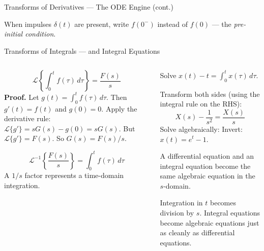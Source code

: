\documentclass[aspectratio=169,11pt]{beamer}
\newcommand{\resizeeq}[1]{\resizebox{\textwidth}{!}{$#1$}}
\begin{document}
\begin{frame}{Transforms of Derivatives --- The ODE Engine (cont.)}
\footnotesize
\begin{warningbox}
When impulses $\delta(t)$ are present, write $f(0^{-})$ instead of $f(0)$ --- the \emph{pre-initial condition}.
\end{warningbox}
\end{frame}

\begin{frame}{Transforms of Integrals --- and Integral Equations}
\footnotesize
\begin{columns}[T]
\begin{column}{0.42\textwidth}
\begin{formulabox}
\[\mathcal{L}\!\left\{\int_0^t f(\tau)\,d\tau\right\} = \frac{F(s)}{s}\]
\textbf{Proof.} Let $g(t) = \int_0^t f(\tau)\,d\tau$. Then $g'(t) = f(t)$ and $g(0) = 0$. Apply the derivative rule: $\mathcal{L}\{g'\} = sG(s) - g(0) = sG(s)$. But $\mathcal{L}\{g'\} = F(s)$. So $G(s) = F(s)/s$.
\end{formulabox}
\vspace{0.5mm}
\begin{methodbox}[Inverting $F(s)/s$]
\[\mathcal{L}^{-1}\!\left\{\frac{F(s)}{s}\right\} = \int_0^t f(\tau)\,d\tau\]
A $1/s$ factor represents a time-domain integration.
\end{methodbox}
\end{column}
\begin{column}{0.56\textwidth}
\begin{examplebox}
Solve $x(t) - t = \int_0^t x(\tau)\,d\tau$.

Transform both sides (using the integral rule on the RHS):
\[X(s) - \frac{1}{s^2} = \frac{X(s)}{s}\]
Solve algebraically:
\resizeeq{X(s)\!\left(1 - \frac{1}{s}\right) = \frac{1}{s^2} \;\Rightarrow\; X(s) = \frac{1}{s(s-1)} = \frac{1}{s-1} - \frac{1}{s}}
Invert: $x(t) = e^t - 1$.

\medskip
A differential equation and an integral equation become the same algebraic equation in the $s$-domain.
\end{examplebox}
\vspace{0.5mm}
\begin{conceptbox}
Integration in $t$ becomes division by $s$. Integral equations become algebraic equations just as cleanly as differential equations.
\end{conceptbox}
\end{column}
\end{columns}
\end{frame}
\end{document}
